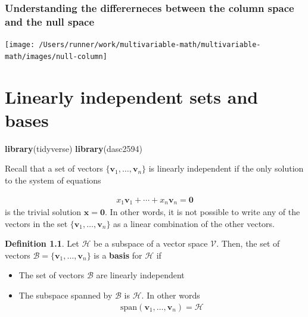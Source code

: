 \documentclass[
]{book}
\newenvironment{Shaded}{\begin{snugshade}}{\end{snugshade}}
\newcommand{\KeywordTok}[1]{\textcolor[rgb]{0.13,0.29,0.53}{\textbf{#1}}}
\newcommand{\NormalTok}[1]{#1}
\theoremstyle{definition}
\newtheorem{definition}{Definition}[chapter]
\theoremstyle{definition}
\theoremstyle{definition}
\theoremstyle{definition}
\theoremstyle{remark}
\begin{document}
\hypertarget{understanding-the-differerneces-between-the-column-space-and-the-null-space}{%
\subsection{Understanding the differerneces between the column space and the null space}\label{understanding-the-differerneces-between-the-column-space-and-the-null-space}}

\texttt{[image: /Users/runner/work/multivariable-math/multivariable-math/images/null-column]}

\hypertarget{linearly-independent-sets-and-bases}{%
\chapter{Linearly independent sets and bases}\label{linearly-independent-sets-and-bases}}

\begin{Shaded}
\begin{Highlighting}[]
\KeywordTok{library}\NormalTok{(tidyverse)}
\KeywordTok{library}\NormalTok{(dasc2594)}
\end{Highlighting}
\end{Shaded}

Recall that a set of vectors \(\{ \mathbf{v}_1, \ldots, \mathbf{v}_n\}\) is linearly independent if the only solution to the system of equations

\[
\begin{aligned}
x_1 \mathbf{v}_1 + \cdots + x_n \mathbf{v}_n = \mathbf{0}
\end{aligned}
\]
is the trivial solution \(\mathbf{x} = \mathbf{0}\). In other words, it is not possible to write any of the vectors in the set \(\{ \mathbf{v}_1, \ldots, \mathbf{v}_n\}\) as a linear combination of the other vectors.

\begin{definition}

Let \(\mathcal{H}\) be a subspace of a vector space \(\mathcal{V}\). Then, the set of vectors \(\mathcal{B} = \{ \mathbf{v}_1, \ldots, \mathbf{v}_n \}\) is a \textbf{basis} for \(\mathcal{H}\) if

\begin{itemize}
\item
  The set of vectors \(\mathcal{B}\) are linearly independent
\item
  The subspace spanned by \(\mathcal{B}\) is \(\mathcal{H}\). In other words
  \[
  \begin{aligned}
  \mbox{span}(\mathbf{v}_1, \ldots, \mathbf{v}_n) = \mathcal{H}
  \end{aligned}
  \]
\end{itemize}

\end{definition}
\end{document}

